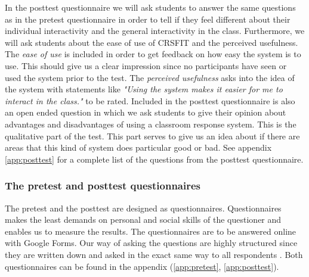 In the posttest questionnaire we will ask students to answer the same questions as in the pretest questionnaire in order to tell if they feel different about their individual interactivity and the general interactivity in the class. Furthermore, we will ask students about the ease of use of CRSFIT and the perceived usefulness. The \emph{ease of use} is included in order to get feedback on how easy the system is to use. This should give us a clear impression since no participants have seen or used the system prior to the test. The \emph{perceived usefulness} asks into the idea of the system with statements like \emph{"Using the system makes it easier for me to interact in the class."} to be rated. Included in the posttest questionnaire is also an open ended question in which we ask students to give their opinion about advantages and disadvantages of using a classroom response system. This is the qualitative part of the test. This part serves to give us an idea about if there are areas that this kind of system does particular good or bad. See appendix \ref{app:posttest} for a complete list of the questions from the posttest questionnaire. 




\subsubsection{The pretest and posttest questionnaires} %
The pretest and the posttest are designed as questionnaires. Questionnaires makes the least demands on personal and social skills of the questioner \cite[p.~74]{deacon2007researching} and enables us to measure the results. The questionnaires are to be answered online with Google Forms. Our way of asking the questions are highly structured since they are written down and asked in the exact same way to all respondents \cite[p.~65]{deacon2007researching}. Both questionnaires can be found in the appendix (\ref{app:pretest}, \ref{app:posttest}).

